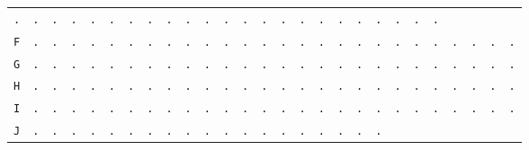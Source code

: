 \begin{figure}[H]
\begin{center}
{\begin{tabular}{c|cccccccccccccccccccccccccc}
        \texttt{.} & \texttt{.} & \texttt{.} & \texttt{.} &
        \texttt{.} & \texttt{.} & \texttt{.} & \texttt{.} &
        \texttt{.} & \texttt{.} & \texttt{.} & \texttt{.} &
        \texttt{.} & \texttt{.} & \texttt{.} & \texttt{.} &
        \texttt{.} & \texttt{.} & \texttt{.} & \texttt{.} &
        \texttt{.} & \texttt{.} & \texttt{.}                             \\
        \texttt{F} & \texttt{.} & \texttt{.} & \texttt{.} &
        \texttt{.} & \texttt{.} & \texttt{.} & \texttt{.} &
        \texttt{.} & \texttt{.} & \texttt{.} & \texttt{.} &
        \texttt{.} & \texttt{.} & \texttt{.} & \texttt{.} &
        \texttt{.} & \texttt{.} & \texttt{.} & \texttt{.} &
        \texttt{.} & \texttt{.} & \texttt{.} & \texttt{.} &
        \texttt{.} & \texttt{.} & \texttt{.}                             \\
        \texttt{G} & \texttt{.} & \texttt{.} & \texttt{.} &
        \texttt{.} & \texttt{.} & \texttt{.} & \texttt{.} &
        \texttt{.} & \texttt{.} & \texttt{.} & \texttt{.} &
        \texttt{.} & \texttt{.} & \texttt{.} & \texttt{.} &
        \texttt{.} & \texttt{.} & \texttt{.} & \texttt{.} &
        \texttt{.} & \texttt{.} & \texttt{.} & \texttt{.} &
        \texttt{.} & \texttt{.} & \texttt{.}                             \\
        \texttt{H} & \texttt{.} & \texttt{.} & \texttt{.} &
        \texttt{.} & \texttt{.} & \texttt{.} & \texttt{.} &
        \texttt{.} & \texttt{.} & \texttt{.} & \texttt{.} &
        \texttt{.} & \texttt{.} & \texttt{.} & \texttt{.} &
        \texttt{.} & \texttt{.} & \texttt{.} & \texttt{.} &
        \texttt{.} & \texttt{.} & \texttt{.} & \texttt{.} &
        \texttt{.} & \texttt{.} & \texttt{.}                             \\
        \texttt{I} & \texttt{.} & \texttt{.} & \texttt{.} &
        \texttt{.} & \texttt{.} & \texttt{.} & \texttt{.} &
        \texttt{.} & \texttt{.} & \texttt{.} & \texttt{.} &
        \texttt{.} & \texttt{.} & \texttt{.} & \texttt{.} &
        \texttt{.} & \texttt{.} & \texttt{.} & \texttt{.} &
        \texttt{.} & \texttt{.} & \texttt{.} & \texttt{.} &
        \texttt{.} & \texttt{.} & \texttt{.}                             \\
        \texttt{J} & \texttt{.} & \texttt{.} & \texttt{.} &
        \texttt{.} & \texttt{.} & \texttt{.} & \texttt{.} &
        \texttt{.} & \texttt{.} & \texttt{.} & \texttt{.} &
        \texttt{.} & \texttt{.} & \texttt{.} & \texttt{.} &
        \texttt{.} & \texttt{.} & \texttt{.} & \texttt{.} &

\end{tabular}}
\end{center}
\end{figure}

